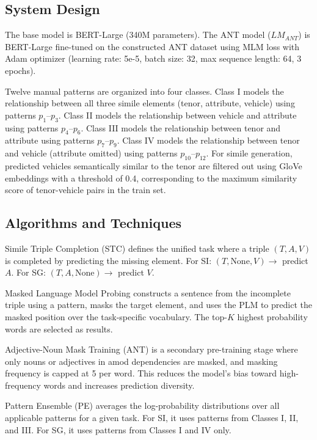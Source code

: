\documentclass[12pt]{article}
\begin{document}
\subsection{System Design}

The base model is BERT-Large (340M parameters). The ANT model ($LM_{ANT}$) is BERT-Large fine-tuned on the constructed ANT dataset using MLM loss with Adam optimizer (learning rate: 5e-5, batch size: 32, max sequence length: 64, 3 epochs).

Twelve manual patterns are organized into four classes. Class I models the relationship between all three simile elements (tenor, attribute, vehicle) using patterns $p_1$--$p_3$. Class II models the relationship between vehicle and attribute using patterns $p_4$--$p_6$. Class III models the relationship between tenor and attribute using patterns $p_7$--$p_9$. Class IV models the relationship between tenor and vehicle (attribute omitted) using patterns $p_{10}$--$p_{12}$. For simile generation, predicted vehicles semantically similar to the tenor are filtered out using GloVe embeddings with a threshold of 0.4, corresponding to the maximum similarity score of tenor-vehicle pairs in the train set.

\subsection{Algorithms and Techniques}

Simile Triple Completion (STC) defines the unified task where a triple $(T, A, V)$ is completed by predicting the missing element. For SI: $(T, \text{None}, V) \rightarrow$ predict $A$. For SG: $(T, A, \text{None}) \rightarrow$ predict $V$.

Masked Language Model Probing constructs a sentence from the incomplete triple using a pattern, masks the target element, and uses the PLM to predict the masked position over the task-specific vocabulary. The top-$K$ highest probability words are selected as results.

Adjective-Noun Mask Training (ANT) is a secondary pre-training stage where only nouns or adjectives in amod dependencies are masked, and masking frequency is capped at 5 per word. This reduces the model's bias toward high-frequency words and increases prediction diversity.

Pattern Ensemble (PE) averages the log-probability distributions over all applicable patterns for a given task. For SI, it uses patterns from Classes I, II, and III. For SG, it uses patterns from Classes I and IV only.
\end{document}
